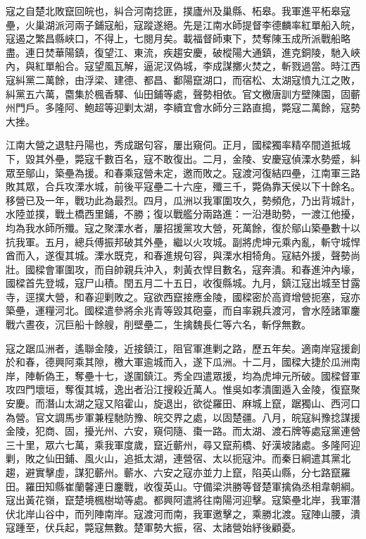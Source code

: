 \begin{pinyinscope}
寇之自楚北敗竄回皖也，糾合河南捻匪，撲廬州及巢縣、柘皋。我軍進平柘皋寇壘，火巢湖派河兩子鋪寇船，寇蹤遂絕。先是江南水師提督李德麟率紅單船入皖，寇遏之繁昌縣峽口，不得上，七閱月矣。載福督師東下，焚奪陳玉成所派戰船略盡。連日焚華陽鎮，復望江、東流，疾趨安慶，破樅陽大通鎮，進克銅陵，馳入峽內，與紅單船合。寇望風瓦解，逼泥汊偽城，李成謀擲火焚之，斬戮過當。時江西寇糾黨二萬餘，由浮梁、建德、都昌、鄱陽竄湖口，而宿松、太湖寇憤九江之敗，糾黨五六萬，麕集於楓香驛、仙田鋪等處，聲勢相依。官文檄唐訓方壁陳園，固蘄州門戶。多隆阿、鮑超等迎剿太湖，李續宜會水師分三路直搗，斃寇二萬餘，寇勢大挫。

江南大營之退駐丹陽也，秀成踞句容，屢出窺伺。正月，國樑獨率精卒間道抵城下，毀其外壘，斃寇千數百名，寇不敢復出。二月，金陵、安慶寇偵溧水勢蹙，糾眾至鄔山，築壘為援。和春乘寇營未定，邀而敗之。寇渡河復結四壘，江南軍三路敗其眾，合兵攻溧水城，前後平寇壘二十六座，殲三千，斃偽靠天侯以下十餘名。移營已及一年，戰功此為最烈。四月，瓜洲以我軍圍攻久，勢頻危，乃出背城計，水陸並撲，戰土橋西里鋪，不勝；復以戰艦分兩路進：一沿港助勢，一渡江他擾，均為我水師所殲。寇之聚溧水者，屢招援黨攻大營，死萬餘，復於鄔山築壘數十以抗我軍。五月，總兵傅振邦破其外壘，繼以火攻城。副將虎坤元乘內亂，斬守城悍酋而入，遂復其城。溧水既克，和春進規句容，與溧水相犄角。寇結外援，聲勢尚壯。國樑會軍圍攻，而自帥親兵沖入，刺黃衣悍目數名，寇奔潰。和春進沖內壕，國樑首先登城，寇尸山積。閏五月二十五日，收復縣城。九月，鎮江寇出城至甘露寺，逕撲大營，和春迎剿敗之。寇欲西竄接應金陵，國樑密於高資增營扼塞，寇亦築壘，運糧河北。國樑遣參將余兆青等毀其砲臺，而自率親兵渡河，會水陸諸軍鏖戰六晝夜，沉巨船十餘艘，削壁壘二，生擒魏長仁等六名，斬俘無數。

寇之踞瓜洲者，遙聯金陵，近接鎮江，阻官軍進剿之路，歷五年矣。適南岸寇援創於和春，德興阿乘其隙，檄大軍逾城而入，遂下瓜洲。十二月，國樑大捷於瓜洲南岸，陣斬偽王，奪壘十七，遂圍鎮江。秀全四遣眾援，均為虎坤元所破。國樑督軍攻四門壞垣，奪復其城，逸出者沿江搜殺近萬人。惟吳如孝潰圍遁入金陵，復竄聚安慶。而潛山太湖之寇又陷霍山，旋退出，欲從羅田、麻城上竄，踞獨山、西河口為營。官文調馬步軍兼程馳防豫、皖交界之處，以固楚疆。八月，皖寇糾豫捻謀援金陵，犯商、固，擾光州、六安，窺伺隨、棗一路。而太湖、渡石牌等處寇黨連營三十里，眾六七萬，乘我軍度歲，竄近蘄州，尋又竄荊橋、好漢坡諸處。多隆阿迎剿，敗之仙田鋪、風火山，追抵太湖，連營宿、太以扼寇沖。而秦日綱遣其黨北趨，避實擊虛，謀犯蘄州。蘄水、六安之寇亦並力上竄，陷英山縣，分七路竄羅田。羅田知縣崔蘭馨連日鏖戰，收復英山。守備梁洪勝等督楚軍擒偽丞相韋朝綱。寇出黃花嶺，竄楚境楓樹坳等處。都興阿遣將往南陽河迎擊。寇築壘北岸，我軍潛伏北岸山谷中，而列陣南岸。寇渡河而南，我軍邀擊之，乘勝北渡。寇陣山腰，潰寇踵至，伏兵起，斃寇無數。楚軍勢大振，宿、太諸營始紓後顧憂。


\end{pinyinscope}
